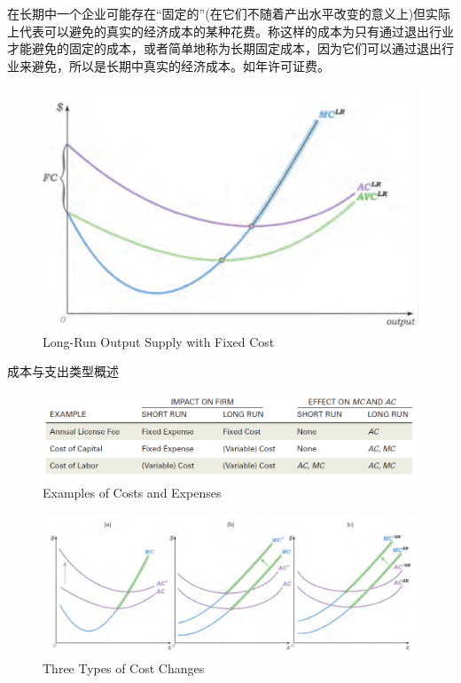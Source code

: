 \documentclass{article}
\begin{document}
在长期中一个企业可能存在“固定的”(在它们不随着产出水平改变的意义上)但实际上代表可以避免的真实的经济成本的某种花费。称这样的成本为只有通过退出行业才能避免的固定的成本，或者简单地称为长期固定成本，因为它们可以通过退出行业来避免，所以是长期中真实的经济成本。如年许可证费。

\begin{figure}[H] %
	\centering %
	\includegraphics[width=1\textwidth]{13_3} %
	\caption{Long-Run Output Supply with Fixed Cost} %
	\label{Fig.main4} %
\end{figure}

成本与支出类型概述

\begin{figure}[H] %
	\centering %
	\includegraphics[width=1\textwidth]{13_4} %
	\caption{Examples of Costs and Expenses} %
	\label{Fig.main5} %
\end{figure}

\begin{figure}[H] %
	\centering %
	\includegraphics[width=1\textwidth]{13_5} %
	\caption{Three Types of Cost Changes} %
	\label{Fig.main6} %
\end{figure}
\end{document}
